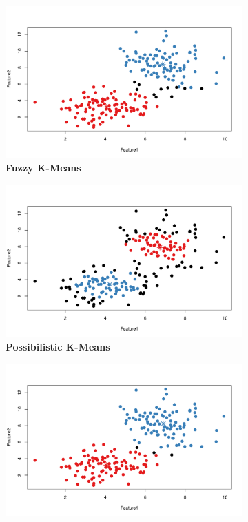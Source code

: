\documentclass[12pt]{article}
\begin{document}
\begin{figure}[h]
	\centering
	\begin{subfigure}[h]{0.49\textwidth}
		\centering
		\includegraphics[width=\textwidth]{DemoDataC2D2a_fkm}
		\caption{\textbf{Fuzzy K-Means}}
		\label{fig:DemoDataC2D2a_fkm}
	\end{subfigure}
	\begin{subfigure}[h]{0.49\textwidth}
		\centering
		\includegraphics[width=\textwidth]{DemoDataC2D2a_pcm}
		\caption{\textbf{Possibilistic K-Means}}
		\label{fig:DemoDataC2D2a_pcm}
	\end{subfigure}
	\begin{subfigure}[h]{0.49\textwidth}
		\centering
		\includegraphics[width=\textwidth]{DemoDataC2D2a_mclust}

\end{subfigure}
\end{figure}
\end{document}
